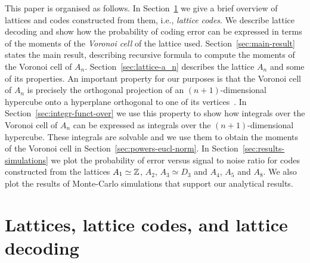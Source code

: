 \documentclass[journal]{IEEEtran}
\begin{document}
This paper is organised as follows.  In Section~\ref{sec:latt-latt-codes} we give a brief overview of lattices and codes constructed from them, i.e., \emph{lattice codes}.  We describe lattice decoding and show how the probability of coding error can be expressed in terms of the moments of the \emph{Voronoi cell} of the lattice used.  Section~\ref{sec:main-result} states the main result, describing recursive formula to compute the moments of the Voronoi cell of $A_n$.  Section~\ref{sec:lattice-a_n} describes the lattice $A_n$ and some of its properties.  An important property for our purposes is that the Voronoi cell of $A_n$ is precisely the orthogonal projection of an $(n+1)$-dimensional hypercube onto a hyperplane orthogonal to one of its vertices~\cite{McKilliam2009CoxeterLattices,McKilliam2010thesis}.
In Section~\ref{sec:integr-funct-over} we use this property to show how integrals over the Voronoi cell of $A_n$ can be expressed as integrals over the $(n+1)$-dimensional hypercube. These integrals are solvable and we use them to obtain the moments of the Voronoi cell in Section~\ref{sec:powers-eucl-norm}.  In Section~\ref{sec:results-simulations} we plot the probability of error versus signal to noise ratio for codes constructed from the lattices $A_1 \simeq {\mathbb Z}$, $A_2$, $A_3 \simeq D_3$ and $A_4$, $A_5$ and $A_8$.  We also plot the results of Monte-Carlo simulations that support our analytical results.




\section{Lattices, lattice codes, and lattice decoding} \label{sec:latt-latt-codes}
\end{document}
